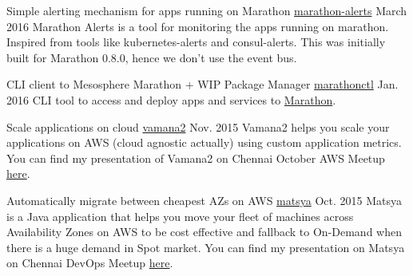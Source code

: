 
\begin{cventries}

  \cventry
    {Simple alerting mechanism for apps running on Marathon} %
    {\href{https://github.com/ashwanthkumar/marathon-alerts}{marathon-alerts}} %
    {March 2016} %
    {} %
    {
    Marathon Alerts is a tool for monitoring the apps running on marathon. Inspired from tools like kubernetes-alerts and consul-alerts.
    This was initially built for Marathon 0.8.0, hence we don't use the event bus.
    }

  \cventry
    {CLI client to Mesosphere Marathon + WIP Package Manager} %
    {\href{https://github.com/ashwanthkumar/marathonctl}{marathonctl}} %
    {Jan. 2016} %
    {} %
    {
    CLI tool to access and deploy apps and services to \href{https://mesosphere.github.io/marathon/}{Marathon}.
    }

  \cventry
    {Scale applications on cloud} %
    {\href{https://github.com/ashwanthkumar/vamana2}{vamana2}} %
    {Nov. 2015} %
    {} %
    {
    Vamana2 helps you scale your applications on AWS (cloud agnostic actually) using custom application metrics.
    You can find my presentation of Vamana2 on Chennai October AWS Meetup \href{http://j.mp/to-vamana}{here}.
    }

  \cventry
    {Automatically migrate between cheapest AZs on AWS} %
    {\href{https://github.com/ashwanthkumar/matsya}{matsya}} %
    {Oct. 2015} %
    {} %
    {
    Matsya is a Java application that helps you move your fleet of machines across Availability Zones
    on AWS to be cost effective and fallback to On-Demand when there is a huge demand in Spot market.
    You can find my presentation on Matsya on Chennai DevOps Meetup \href{j.mp/to-matsya}{here}.
    }


\end{cventries}
